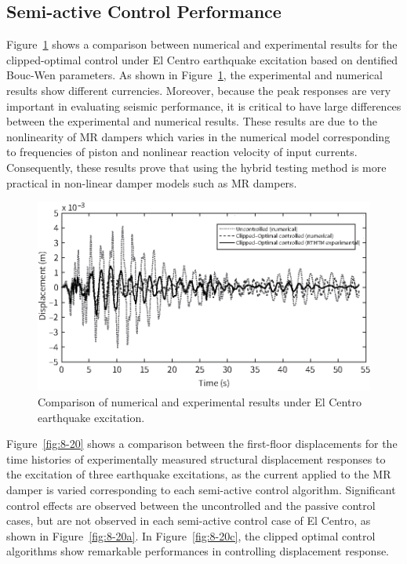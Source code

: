 \subsection{Semi-active Control Performance}
Figure~\ref{fig:8-19} shows a comparison between numerical and experimental results for the clipped-optimal control under El Centro earthquake excitation based on dentified Bouc-Wen parameters. As shown in Figure~\ref{fig:8-19}, the experimental and numerical results show different currencies. Moreover, because the peak responses are very important in evaluating seismic performance, it is critical to have large differences between the experimental and numerical results. These results are due to the nonlinearity of MR dampers which varies in the numerical model corresponding to frequencies of piston and nonlinear reaction velocity of input currents. Consequently, these results prove that using the hybrid testing method is more practical in non-linear damper models such as MR dampers.

\begin{figure}[H]
\centering
\includegraphics[width=1\textwidth] {figure/8-19.eps}
\caption{Comparison of numerical and experimental results under El Centro earthquake excitation.}
\label{fig:8-19}
\end{figure}

Figure~\ref{fig:8-20} shows a comparison between the first-floor displacements for the time histories of experimentally measured structural displacement responses to the excitation of three earthquake excitations, as the current applied to the MR damper is varied corresponding to each semi-active control algorithm. Significant control effects are observed between the uncontrolled and the passive control cases, but are not observed in each semi-active control case of El Centro, as shown in Figure~\ref{fig:8-20a}. In Figure~\ref{fig:8-20c}, the clipped optimal control algorithms show remarkable performances in controlling displacement response.


